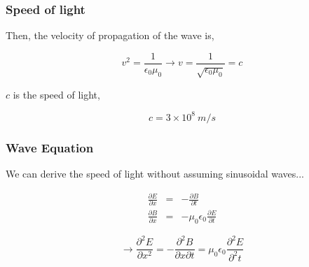 \documentclass[]{beamer}
\begin{document}
\begin{frame}

\frametitle{Speed of light}



Then, the velocity of propagation of the wave is,

\begin{equation}
v^2=\frac{1}{\epsilon_0\mu_0}\rightarrow v=\frac{1}{\sqrt{\epsilon_0 \mu_0}}=c
\end{equation}

$c$ is the speed of light,

\begin{equation}
c=3\times 10^8~ m/s
\end{equation}

  \end{frame}






\begin{frame}

\frametitle{Wave Equation}

We can derive the speed of light without assuming sinusoidal waves...
\pause
\vspace{3mm}

\begin{eqnarray*}
  \frac{\partial E}{\partial x}&=&-\frac{\partial B}{\partial t}\\
 \frac{\partial B}{\partial x}&=&-\mu_0\epsilon_0 \frac{\partial E}{\partial t}
\end{eqnarray*}

\pause

\begin{equation}
\rightarrow \frac{\partial^2 E}{\partial x^2}=-\frac{\partial^2 B }{\partial x\partial t}=\mu_0\epsilon_0\frac{\partial^2 E}{\partial^2 t}
\end{equation}


  \end{frame}




\end{document}
